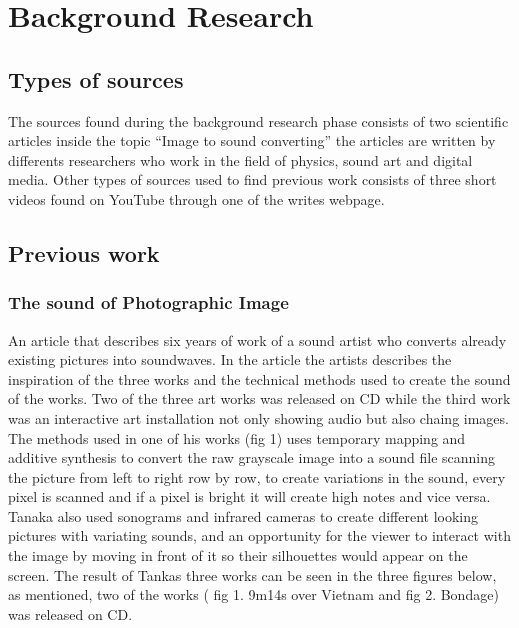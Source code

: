 \chapter{Background Research}\label{ch:bgresearch}



\section{Types of sources}\label{sec:typesofsources} 
The sources found during the background research phase consists of two scientific articles inside the topic “Image to sound converting” the articles are written by differents researchers who work in the field of physics, sound art and digital media. Other types of sources used to find previous work consists of three short videos found on YouTube through one of the writes webpage. 


\section{Previous work}\label{sec:previouswork}

\subsection{The sound of Photographic Image}\label{sec:soundarticle}
An article that describes six years of work of a sound artist who converts already existing pictures into soundwaves. In the article the artists describes the inspiration of the three works and the technical methods used to create the sound of the works. Two of the three art works was released on CD while the third work was an interactive art installation not only showing audio but also chaing images. The methods used in one of his works (fig 1) uses temporary mapping and additive synthesis to convert the raw grayscale image into a sound file scanning the picture from left to right row by row, to create variations in the sound, every pixel is scanned and if a pixel is bright it will create high notes and vice versa.  Tanaka also used sonograms and infrared cameras to create different looking pictures with variating sounds, and an opportunity for the viewer to interact with the image by moving in front of it so their silhouettes would appear on the screen. The result of Tankas three works can be seen in the three figures below, as mentioned, two of the works ( fig 1. 9m14s over Vietnam and fig 2. Bondage) was released on CD.



